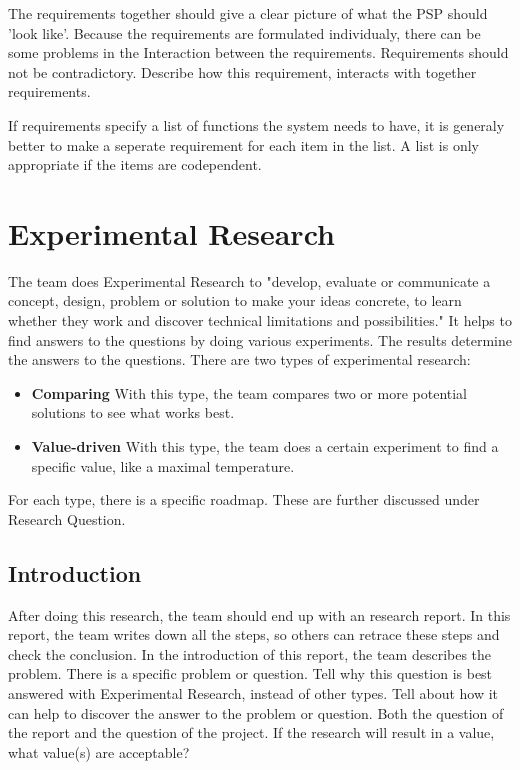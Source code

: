 \documentclass[10pt]{report}
\begin{document}
The requirements together should give a clear picture of what the PSP should 'look like'. Because the requirements are formulated individualy, there can be some problems in the Interaction between the requirements. Requirements should not be contradictory. Describe how this requirement, interacts with together requirements. 

If requirements specify a list of functions the system needs to have, it is generaly better to make a seperate requirement for each item in the list. A list is only appropriate if the items are codependent.

\newpage

\section{Experimental Research}

The team does Experimental Research to "develop, evaluate or communicate a concept, design, problem or solution to make your ideas concrete, to learn whether they work and discover technical limitations and possibilities." It helps to find answers to the questions by doing various experiments. The results determine the answers to the questions. There are two types of experimental research:

\begin{itemize}
	\item \textbf{Comparing} With this type, the team compares two or more potential solutions to see what works best.
	\item \textbf{Value-driven} With this type, the team does a certain experiment to find a specific value, like a maximal temperature.
\end{itemize}

For each type, there is a specific roadmap. These are further discussed under Research Question.

\subsection{Introduction}

After doing this research, the team should end up with an research report. In this report, the team writes down all the steps, so others can retrace these steps and check the conclusion. In the introduction of this report, the team describes the problem. There is a specific problem or question. Tell why this question is best answered with Experimental Research, instead of other types. Tell about how it can help to discover the answer to the problem or question. Both the question of the report and the question of the project. If the research will result in a value, what value(s) are acceptable?
\end{document}

